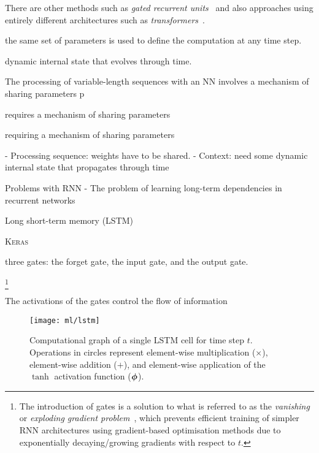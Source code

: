 There are other methods such as \emph{gated recurrent units}~\cite{} and also
approaches using entirely different architectures such as
\emph{transformers}~\cite{vaswani2017attention}.

the same set of parameters is used to define the computation at any time step.

dynamic internal state that evolves through time.

The processing of variable-length sequences with an NN involves a mechanism of
sharing parameters p

requires a mechanism of
sharing parameters


requiring a mechanism of sharing parameters









- Processing sequence: weights have to be shared.
- Context: need some dynamic internal state that propagates through time

Problems with RNN
- The problem of learning long-term dependencies in recurrent networks

Long short-term memory (LSTM)~\cite{lstm}

\textsc{Keras}~\cite{keras}




three gates: the forget gate, the input gate, and the output gate.


\footnote{The introduction of gates is a solution to what is referred to as the
  \emph{vanishing} or \emph{exploding gradient
    problem}~\cite{hochreiter1991untersuchungen,}, which prevents efficient
  training of simpler RNN architectures using gradient-based optimisation
  methods due to exponentially decaying/growing gradients with respect to $t$.}




The activations of the gates control the flow of information



\begin{figure}[htbp]
  \centering

  \texttt{[image: ml/lstm]}

  \caption{Computational graph of a single LSTM cell for time step
    $t$. Operations in circles represent element-wise multiplication
    ($\times$), element-wise addition ($+$), and element-wise application of the
    $\tanh$ activation function ($\bm{\phi}$).
  }
  \label{fig:lstm}
\end{figure}






